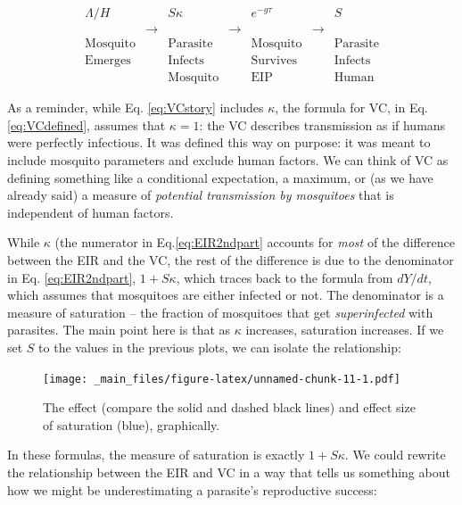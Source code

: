 \documentclass[
]{book}
\begin{document}
\begin{equation}
\begin{array}{|c|c|c|c|c|c|c|}
\Lambda/H &  & S \kappa &  & e^{-g\tau} & & S \\
& \rightarrow &  & \rightarrow &  & \rightarrow &  \\
\mbox{Mosquito} & & \mbox{Parasite} & & \mbox{Mosquito} && \mbox{Parasite} \\
\mbox{Emerges} & & \mbox{Infects} & & \mbox{Survives} && \mbox{Infects} \\
 & & \mbox{Mosquito} & & \mbox{EIP} && \mbox{Human}
\end{array}
\label{eq:VCstory}
\end{equation}

As a reminder, while Eq. \eqref{eq:VCstory} includes \(\kappa\), the formula for VC, in Eq. \eqref{eq:VCdefined}, assumes that \(\kappa=1\): the VC describes transmission as if humans were perfectly infectious. It was defined this way on purpose: it was meant to include mosquito parameters and exclude human factors. We can think of VC as defining something like a conditional expectation, a maximum, or (as we have already said) a measure of \emph{potential transmission by mosquitoes} that is independent of human factors.

While \(\kappa\) (the numerator in Eq.\eqref{eq:EIR2ndpart} accounts for \emph{most} of the difference between the EIR and the VC, the rest of the difference is due to the denominator in Eq. \eqref{eq:EIR2ndpart}, \(1+S\kappa\), which traces back to the formula from \(dY/dt\), which assumes that mosquitoes are either infected or not. The denominator is a measure of saturation -- the fraction of mosquitoes that get \emph{superinfected} with parasites. The main point here is that as \(\kappa\) increases, saturation increases. If we set \(S\) to the values in the previous plots, we can isolate the relationship:

\begin{figure}
\centering
\texttt{[image: \_main\_files/figure-latex/unnamed-chunk-11-1.pdf]}
\caption{\label{fig:unnamed-chunk-11}The effect (compare the solid and dashed black lines) and effect size of saturation (blue), graphically.}
\end{figure}

In these formulas, the measure of saturation is exactly \(1+S\kappa\). We could rewrite the relationship between the EIR and VC in a way
that tells us something about how we might be underestimating a parasite's reproductive success:
\end{document}
